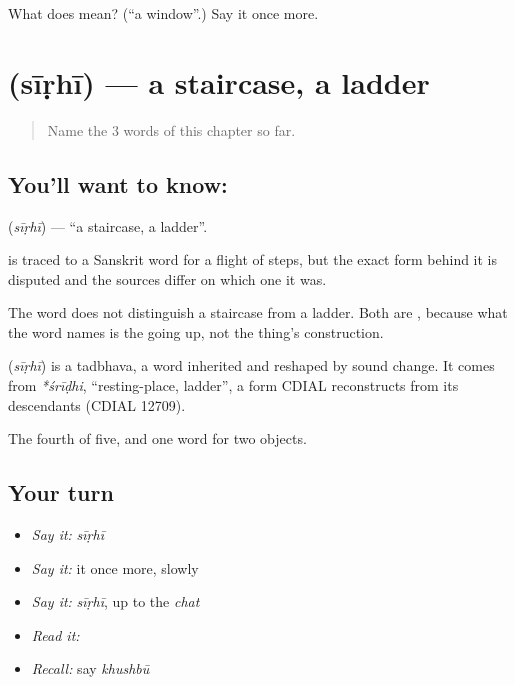 \begin{tcolorbox}[breakable,colback=teal!4,colframe=teal!35!black,title={Before you move on}]
What does  mean? (\textquotedblleft{}a window\textquotedblright{}.) Say it once more.
\end{tcolorbox}
\section[\texorpdfstring{\hi{सीढ़ी} (sīṛhī)}{सीढ़ी (sīṛhī)}]{ (sīṛhī) — a staircase, a ladder}

\label{lesson:HI-C58-stairs}



\begin{quote}
Name the 3 words of this chapter so far.
\end{quote}

\subsection*{You'll want to know: }
\textbf{} (\emph{sīṛhī}) — \textquotedblleft{}a staircase, a ladder\textquotedblright{}.

 is traced to a Sanskrit word for a flight of steps, but the exact form behind it is disputed and the sources differ on which one it was.

The word does not distinguish a staircase from a ladder. Both are , because what the word names is the going up, not the thing's construction.

\begin{cousinweb}
\textbf{} (\emph{sīṛhī}) is a tadbhava, a word inherited and reshaped by sound change. It comes from \emph{*śrīḍhi}, \textquotedblleft{}resting-place, ladder\textquotedblright{}, a form CDIAL reconstructs from its descendants (CDIAL 12709).
\end{cousinweb}

\begin{grammarlens}[title={What you've built}]
The fourth of five, and one word for two objects.
\end{grammarlens}

\subsection*{Your turn}
\begin{itemize}
\raggedright
  \item \emph{Say it:} \emph{sīṛhī}
  \item \emph{Say it:} it once more, slowly
  \item \emph{Say it:} \emph{sīṛhī}, up to the \emph{chat}
  \item \emph{Read it:} \textbf{}
  \item \emph{Recall:} say \emph{khushbū}
\end{itemize}

